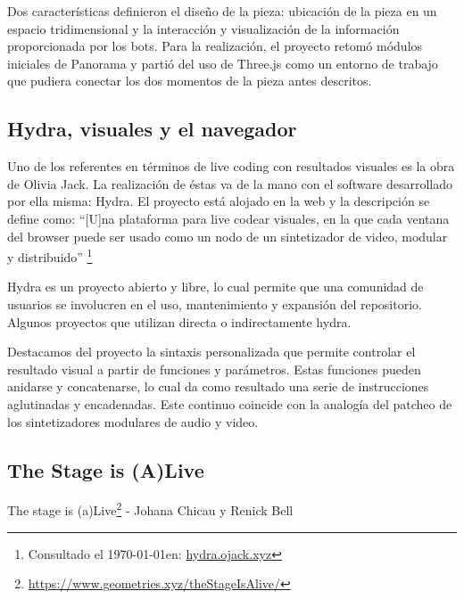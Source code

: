 Dos características definieron el diseño de la pieza: ubicación de la pieza en un espacio tridimensional y la interacción y visualización de la información proporcionada por los bots. Para la realización, el proyecto retomó módulos iniciales de Panorama y partió del uso de Three.js como un entorno de trabajo que pudiera conectar los dos momentos de la pieza antes descritos.

\subsection{Hydra, visuales y el navegador}

Uno de los referentes en términos de live coding con resultados visuales es la obra de Olivia Jack. La realización de éstas va de la mano con el software desarrollado por ella misma: Hydra. El proyecto está alojado en la web y la descripción se define como: ``[U]na plataforma para live codear visuales, en la que cada ventana del browser puede ser usado como un nodo de un sintetizador de video, modular y distribuido'' \footnote{Consultado el \today en: \url{hydra.ojack.xyz}}

Hydra es un proyecto abierto y libre, lo cual permite que una comunidad de usuarios se involucren en el uso, mantenimiento y expansión del repositorio. Algunos proyectos que utilizan directa o indirectamente hydra.

Destacamos del proyecto la sintaxis personalizada que permite controlar el resultado visual a partir de funciones y parámetros. Estas funciones pueden anidarse y concatenarse, lo cual da como resultado una serie de instrucciones aglutinadas y encadenadas. Este continuo coincide con la analogía del patcheo de los sintetizadores modulares de audio y video. 

\subsection{The Stage is (A)Live}

The stage is (a)Live\footnote{\url{https://www.geometries.xyz/theStageIsAlive/}} - Johana Chicau y Renick Bell




